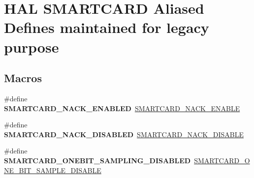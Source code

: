 \hypertarget{group___h_a_l___s_m_a_r_t_c_a_r_d___aliased___defines}{}\section{H\+AL S\+M\+A\+R\+T\+C\+A\+RD Aliased Defines maintained for legacy purpose}
\label{group___h_a_l___s_m_a_r_t_c_a_r_d___aliased___defines}
\subsection*{Macros}
\begin{DoxyCompactItemize}
\item 
\mbox{\label{group___h_a_l___s_m_a_r_t_c_a_r_d___aliased___defines_gacfa3faf135d8fb291f6b1db598e29110}} 
\#define {\bfseries S\+M\+A\+R\+T\+C\+A\+R\+D\+\_\+\+N\+A\+C\+K\+\_\+\+E\+N\+A\+B\+L\+ED}~\hyperlink{group___s_m_a_r_t_c_a_r_d___n_a_c_k___enable_ga83d350ff558fc372bc2efc5b5a477147}{S\+M\+A\+R\+T\+C\+A\+R\+D\+\_\+\+N\+A\+C\+K\+\_\+\+E\+N\+A\+B\+LE}
\item 
\mbox{\label{group___h_a_l___s_m_a_r_t_c_a_r_d___aliased___defines_gae04c68df21068299eac9bf3590b68986}} 
\#define {\bfseries S\+M\+A\+R\+T\+C\+A\+R\+D\+\_\+\+N\+A\+C\+K\+\_\+\+D\+I\+S\+A\+B\+L\+ED}~\hyperlink{group___s_m_a_r_t_c_a_r_d___n_a_c_k___enable_ga746a79736cf7c2f8478b6c00f7908eda}{S\+M\+A\+R\+T\+C\+A\+R\+D\+\_\+\+N\+A\+C\+K\+\_\+\+D\+I\+S\+A\+B\+LE}
\item 
\mbox{\label{group___h_a_l___s_m_a_r_t_c_a_r_d___aliased___defines_ga634f0b5cfe240462c3c195cac2569c1e}} 
\#define {\bfseries S\+M\+A\+R\+T\+C\+A\+R\+D\+\_\+\+O\+N\+E\+B\+I\+T\+\_\+\+S\+A\+M\+P\+L\+I\+N\+G\+\_\+\+D\+I\+S\+A\+B\+L\+ED}~\hyperlink{group___s_m_a_r_t_c_a_r_d___one_bit___sampling_gabf94d10702dc8b36fe2b3bd04be83863}{S\+M\+A\+R\+T\+C\+A\+R\+D\+\_\+\+O\+N\+E\+\_\+\+B\+I\+T\+\_\+\+S\+A\+M\+P\+L\+E\+\_\+\+D\+I\+S\+A\+B\+LE}
\item 
\mbox{\label{group___h_a_l___s_m_a_r_t_c_a_r_d___aliased___defines_ga192982a823e7f6af6258b4169581cceb}} 

\end{DoxyCompactItemize}
